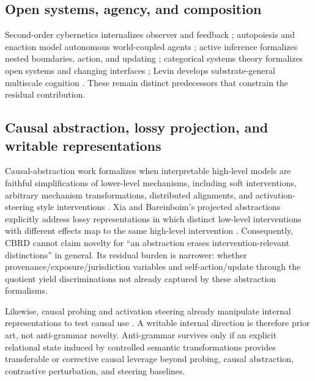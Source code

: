 \subsection{Open systems, agency, and composition}

Second-order cybernetics internalizes observer and feedback \citep{Wiener1948,vonFoerster2003}; autopoiesis and enaction model autonomous world-coupled agents \citep{MaturanaVarela1980,VarelaThompsonRosch1991,Thompson2007}; active inference formalizes nested boundaries, action, and updating \citep{Friston2010,KirchhoffEtAl2018,ParrPezzuloFriston2022}; categorical systems theory formalizes open systems and changing interfaces \citep{VagnerSpivakLerman2015,NiuSpivak2021,Spivak2026Interfaces,Spivak2026Dynamics}; Levin develops substrate-general multiscale cognition \citep{Levin2019,FieldsLevin2022,HartlEtAl2026}. These remain distinct predecessors that constrain the residual contribution.

\subsection{Causal abstraction, lossy projection, and writable representations}

Causal-abstraction work formalizes when interpretable high-level models are faithful simplifications of lower-level mechanisms, including soft interventions, arbitrary mechanism transformations, distributed alignments, and activation-steering style interventions \citep{GeigerEtAl2023,MassiddaEtAl2023,GeigerEtAl2024}. Xia and Bareinboim's projected abstractions explicitly address lossy representations in which distinct low-level interventions with different effects map to the same high-level intervention \citep{XiaBareinboim2025}. Consequently, CBRD cannot claim novelty for ``an abstraction erases intervention-relevant distinctions'' in general. Its residual burden is narrower: whether provenance/exposure/jurisdiction variables and self-action/update through the quotient yield discriminations not already captured by these abstraction formalisms.

Likewise, causal probing and activation steering already manipulate internal representations to test causal use \citep{DengEtAl2026,YeEtAl2026SteeringSignals}. A writable internal direction is therefore prior art, not anti-grammar novelty. Anti-grammar survives only if an explicit relational state induced by controlled semantic transformations provides transferable or corrective causal leverage beyond probing, causal abstraction, contrastive perturbation, and steering baselines.

